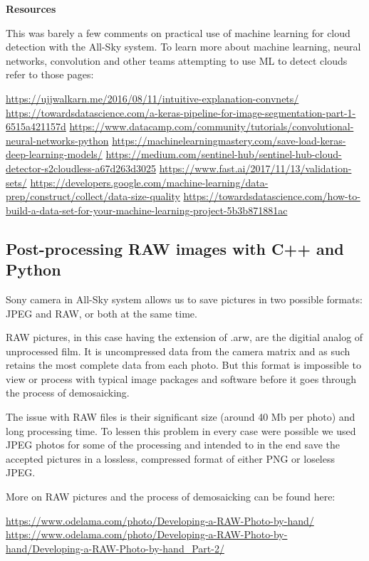 \documentclass[]{book}
\begin{document}
		\textbf{Resources}
		
		This was barely a few comments on practical use of machine learning for cloud detection with the All-Sky system. To learn more about machine learning, neural networks, convolution and other teams attempting to use ML to detect clouds refer to those pages:
		
		\url{https://ujjwalkarn.me/2016/08/11/intuitive-explanation-convnets/}
		\url{https://towardsdatascience.com/a-keras-pipeline-for-image-segmentation-part-1-6515a421157d}
		\url{https://www.datacamp.com/community/tutorials/convolutional-neural-networks-python}
		\url{https://machinelearningmastery.com/save-load-keras-deep-learning-models/}
		\url{https://medium.com/sentinel-hub/sentinel-hub-cloud-detector-s2cloudless-a67d263d3025}
		\url{https://www.fast.ai/2017/11/13/validation-sets/}
		\url{https://developers.google.com/machine-learning/data-prep/construct/collect/data-size-quality}
		\url{https://towardsdatascience.com/how-to-build-a-data-set-for-your-machine-learning-project-5b3b871881ac}

		\subsection{Post-processing RAW images with C++ and Python}
		
		Sony camera in All-Sky system allows us to save pictures in two possible formats: JPEG and RAW, or both at the same time.
		
		RAW pictures, in this case having the extension of .arw, are the digitial analog of unprocessed film. It is uncompressed data from the camera matrix and as such retains the most complete data from each photo. But this format is impossible to view or process with typical image packages and software before it goes through the process of demosaicking.
		
		The issue with RAW files is their significant size (around 40 Mb per photo) and long processing time. To lessen this problem in every case were possible we used JPEG photos for some of the processing and intended to in the end save the accepted pictures in a lossless, compressed format of either PNG or loseless JPEG.
		
		More on RAW pictures and the process of demosaicking can be found here:
		
		\url{https://www.odelama.com/photo/Developing-a-RAW-Photo-by-hand/}
		\url{https://www.odelama.com/photo/Developing-a-RAW-Photo-by-hand/Developing-a-RAW-Photo-by-hand_Part-2/}
		
\end{document}
